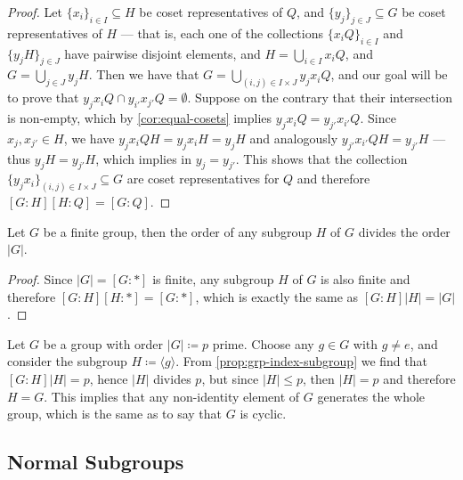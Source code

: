 \begin{proof}
Let \(\{x_{i}\}_{i \in I} \subseteq H\) be coset representatives of \(Q\), and
\(\{y_{j}\}_{j \in J} \subseteq G\) be coset representatives of \(H\) --- that
is, each one of the collections \(\{x_i Q\}_{i \in I}\) and \(\{y_{j} H\}_{j \in
J}\) have pairwise disjoint elements, and \(H = \bigcup_{i \in I} x_i Q\), and
\(G = \bigcup_{j \in J} y_j H\). Then we have that \(G = \bigcup_{(i, j) \in I
\times J} y_j x_i Q\), and our goal will be to prove that \(y_j x_i Q \cap
y_{i'} x_{j'} Q = \emptyset\). Suppose on the contrary that their intersection
is non-empty, which by \cref{cor:equal-cosets} implies \(y_j x_i Q = y_{j'}
x_{i'} Q\). Since \(x_j, x_{j'} \in H\), we have \(y_j x_i Q H = y_j x_i H = y_j
H\) and analogously \(y_{j'} x_{i'} Q H = y_{j'} H\) --- thus \(y_j H = y_{j'}
H\), which implies in \(y_j = y_{j'}\). This shows that the collection \(\{y_{j}
x_i\}_{(i, j) \in I \times J} \subseteq G\) are coset representatives for \(Q\)
and therefore \([G \colon H] [H \colon Q] = [G \colon Q]\).
\end{proof}

\begin{corollary}
\label{cor:order-subgroup-divides-order-group}
Let \(G\) be a finite group, then the order of any subgroup \(H\) of \(G\)
divides the order \(|G|\).
\end{corollary}

\begin{proof}
Since \(|G| = [G \colon *]\) is finite, any subgroup \(H\) of \(G\) is also
finite and therefore \([G \colon H] [H \colon *] = [G \colon *]\), which is
exactly the same as \([G \colon H] |H| = |G|\).
\end{proof}

\begin{example}
\label{exp:grp-prime-order-cyclic}
Let \(G\) be a group with order \(|G| \coloneq p\) prime. Choose any \(g \in G\)
with \(g \neq e\), and consider the subgroup \(H \coloneq \langle g
\rangle\). From \cref{prop:grp-index-subgroup} we find that \([G \colon H] |H| =
p\), hence \(|H|\) divides \(p\), but since \(|H| \leq p\), then \(|H| = p\) and
therefore \(H = G\). This implies that any non-identity element of \(G\)
generates the whole group, which is the same as to say that \(G\) is cyclic.
\end{example}

\subsection{Normal Subgroups}

